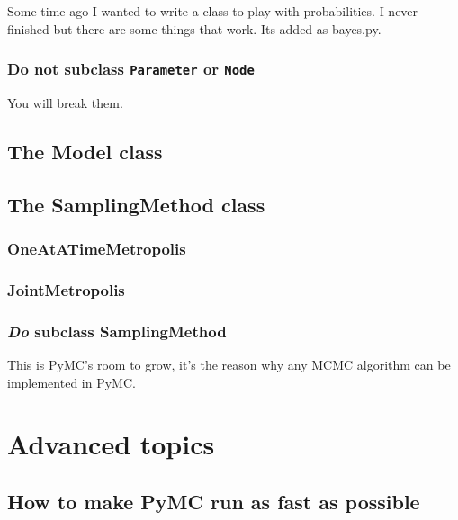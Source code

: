\documentclass[]{book}
\begin{document}
Some time ago I wanted to write a class to play with probabilities. I never finished but there are some things that work. Its added as bayes.py. 

\subsection{Do not subclass \texttt{Parameter} or \texttt{Node}}\label{notsubclass} %

You will break them.


\section{The Model class}\label{sec:Model} %


\section{The SamplingMethod class}\label{sec:SamplingMethod} %

\subsection{OneAtATimeMetropolis}\label{sub:oneatatimemetropolis} %

\subsection{JointMetropolis}\label{sub:jointmetropolis} %

\subsection{\emph{Do} subclass SamplingMethod}\label{sub:do_subclass} %
This is PyMC's room to grow, it's the reason why any MCMC algorithm can be implemented in PyMC.




\chapter{Advanced topics} 

\section{How to make PyMC run as fast as possible}\label{sec:fast} %
\end{document}
